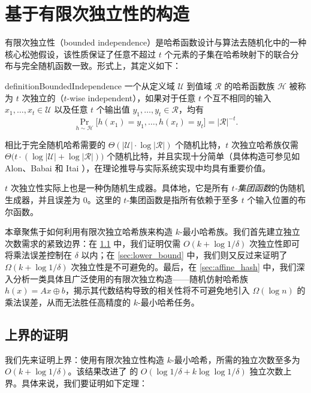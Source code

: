 \section{基于有限次独立性的构造}\label{sec:bounded_independence}

有限次独立性（bounded independence）是哈希函数设计与算法去随机化中的一种核心松弛假设，该性质保证了任意不超过 $t$ 个元素的子集在哈希映射下的联合分布与完全随机函数一致。形式上，其定义如下：

\begin{restatable}{definition}{BoundedIndependence}\label{def:t_wise_independence}
    一个从定义域 $\mathcal{U}$ 到值域 $\mathcal{R}$ 的哈希函数族 $\mathcal{H}$ 被称为 $t$ 次独立的（$t$-wise independent），如果对于任意 $t$ 个互不相同的输入 $x_1, \dots, x_t \in \mathcal{U}$ 以及任意 $t$ 个输出值 $y_1, \dots, y_t \in \mathcal{R}$，均有
    $$
    \Pr_{h \sim \mathcal{H}}\big[h(x_1)=y_1, \dots, h(x_t)=y_t\big] = |\mathcal{R}|^{-t}.
    $$
\end{restatable}

相比于完全随机哈希需要的 $\Theta(|\mathcal{U}| \cdot \log |\mathcal{R}|)$ 个随机比特，$t$ 次独立哈希族仅需 $\Theta\big(t \cdot (\log |\mathcal{U}| + \log |\mathcal{R}|)\big)$ 个随机比特，并且实现十分简单（具体构造可参见如 Alon、Babai 和 Itai \cite{ABI86_construction_t_wise}），在理论推导与实际系统实现中均具有重要价值。

$t$ 次独立性实际上也是一种伪随机生成器。具体地，它是所有 \emph{$t$-集团函数}的伪随机生成器，并且误差为 $0$。这里的 $t$-集团函数是指所有依赖于至多 $t$ 个输入位置的布尔函数。

本章聚焦于如何利用有限次独立哈希族来构造 $k$-最小哈希族。我们首先建立独立次数需求的紧致边界：在 \ref{sec:upper_bound} 中，我们证明仅需 $O(k + \log 1 / \delta)$ 次独立性即可将乘法误差控制在 $\delta$ 以内；在 \ref{sec:lower_bound} 中，我们则又反过来证明了 $\Omega(k + \log 1 / \delta)$ 次独立性是不可避免的。最后，在 \ref{sec:affine_hash} 中，我们深入分析一类具体且广泛使用的有限次独立构造——随机仿射哈希族 $h(x) = Ax \oplus b$，揭示其代数结构导致的相关性将不可避免地引入 $\Omega(\log n)$ 的乘法误差，从而无法胜任高精度的 $k$-最小哈希任务。

\subsection{上界的证明}\label{sec:upper_bound}

我们先来证明上界：使用有限次独立性构造 $k$-最小哈希，所需的独立次数至多为 $O(k + \log 1 / \delta)$。该结果改进了 \cite{minwise_FPS11} 的 $O(\log 1 / \delta + k \log \log 1 / \delta)$ 独立次数上界。具体来说，我们要证明如下定理：

